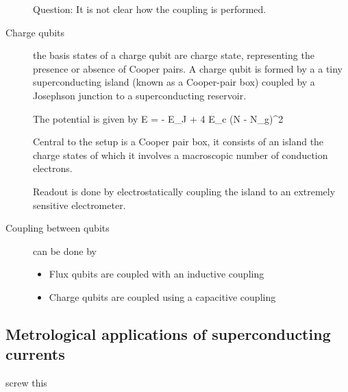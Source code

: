 \begin{description}
Question: It is not clear how the coupling is performed. 

\item[Charge qubits] the basis states of a charge qubit are charge state, representing the presence or absence of Cooper pairs. A charge qubit is formed by a a tiny superconducting island (known as a Cooper-pair box) coupled by a Josephson junction to a superconducting reservoir. 

The potential is given by 
\beq
E = - E_J \cos{\phi}   + 4 E_c (N - N_g)^2
\eeq

Central to the setup is a Cooper pair box, it consists of an island the charge states of which it involves a macroscopic number of conduction electrons. 

Readout is done by electrostatically coupling the island to an extremely sensitive electrometer. 

\item[Coupling between qubits]  can be done by
\begin{itemize}
\item Flux qubits are coupled with an inductive coupling
\item Charge qubits are coupled using a capacitive coupling
\end{itemize}

\end{description}

\subsection{Metrological applications of superconducting currents}
\begin{description}
\item[screw this]

\end{description}

